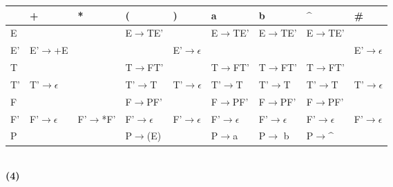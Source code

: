 \documentclass{article}
\begin{document}
\begin{table}[h]
    \centering
\begin{tabular}{|p{1.4cm}<{\centering}|p{1.4cm}<{\centering}|p{1.4cm}<{\centering}|p{1.4cm}<{\centering}|p{1.4cm}<{\centering}|p{1.4cm}<{\centering}|p{1.4cm}<{\centering}|p{1.4cm}<{\centering}|p{1.4cm}<{\centering}|}   
    \hline
    & + & * & ( & ) & a & b & $\^{}$ & \# \\
    \hline
    E &&& E$\rightarrow$TE' && E$\rightarrow$TE' & E$\rightarrow$TE' & E$\rightarrow$TE' &\\
    \hline
    E' & E'$\rightarrow$+E &&& E'$\rightarrow\epsilon$ &&&& E'$\rightarrow\epsilon$ \\
    \hline
    T &&& T$\rightarrow$FT' && T$\rightarrow$FT' & T$\rightarrow$FT' & T$\rightarrow$FT' &\\
    \hline
    T' & T'$\rightarrow\epsilon$ & & T'$\rightarrow$T & T'$\rightarrow\epsilon$ & T'$\rightarrow$T & T'$\rightarrow$T & T'$\rightarrow$T & T'$\rightarrow\epsilon$ \\
    \hline
    F &&& F$\rightarrow$PF' && F$\rightarrow$PF' & F$\rightarrow$PF' & F$\rightarrow$PF' & \\
    \hline
    F' & F'$\rightarrow\epsilon$ & F'$\rightarrow$*F' & F'$\rightarrow\epsilon$ & F'$\rightarrow\epsilon$ & F'$\rightarrow\epsilon$ & F'$\rightarrow\epsilon$ & F'$\rightarrow\epsilon$ & F'$\rightarrow\epsilon$ \\
    \hline
    P &&& P$\rightarrow$(E) && P$\rightarrow$a & P$\rightarrow$ b & P$\rightarrow$$\^{}$ &\\
    \hline
\end{tabular}
\end{table}
\\
\textbf{(4)}
\end{document}

